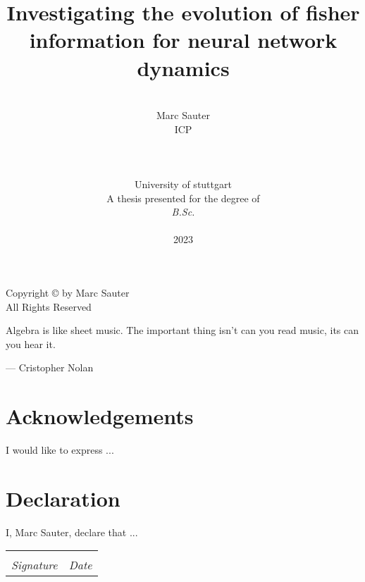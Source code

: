 \documentclass[12pt, a4paper]{report}
\date{}
\title{Investigating the evolution of fisher information for neural network dynamics}
\author{\\ \Large{Marc Sauter}
	\\ ICP
	\\
	\\
	\\
	\\ University of stuttgart
	\\
	A thesis presented for the degree of \\ \textit{B.Sc.}
	\\ \\
	2023
}
\begin{document}
	\thispagestyle{headings}
	\maketitle
	\FloatBarrier
	
	\newpage
	\thispagestyle{empty}
	\vspace*{\fill}
	\begin{center}
		Copyright \copyright  {} by Marc Sauter \\ All Rights Reserved
	\end{center}
	\vspace*{\fill}
	\newpage
	\thispagestyle{empty}
	\epigraph{Algebra is like sheet music. The important thing isn't can you read music, its can you hear it.}{--- \textup{Cristopher Nolan}}
	
	\thispagestyle{empty}
	\chapter*{Acknowledgements}
	I would like to express ...
	
	
	\thispagestyle{empty}
	\chapter*{Declaration}
	I, Marc Sauter, declare that ...
	
	\vspace{3cm}
	\noindent\begin{tabular}{ll}
		\makebox[2.5in]{\hrulefill} & \makebox[2.5in]{\hrulefill}\\
		\textit{Signature} & \textit{Date}\\
	\end{tabular}
	
	\thispagestyle{empty}
	\begin{abstract}
		\lipsum[1-2]
		
	\end{abstract}
	\tableofcontents
	\thispagestyle{plain}
	\listoffigures
	\listoftables
	
\end{document}
